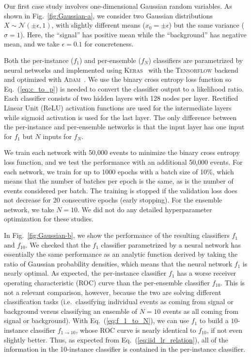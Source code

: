 \documentclass[aps,prx,reprint,preprintnumbers,superscriptaddress,nofootinbib,longbibliography,floatfix]{revtex4-2}
\DeclareRobustCommand{\Fig}[1]{Fig.~\ref{fig:#1}}
\DeclareRobustCommand{\Eq}[1]{Eq.~(\ref{eq:#1})}
\begin{document}
Our first case study involves one-dimensional Gaussian random variables.
%
As shown in \Fig{Gaussian-a}, we consider two Gaussian distributions $X\sim\mathcal{N}(\pm\epsilon,1)$, with slightly different means ($x_0 = \pm \epsilon$) but the same variance ($\sigma = 1$).
%
Here, the ``signal'' has positive mean while the ``background'' has negative mean, and we take $\epsilon=0.1$ for concreteness.


Both the per-instance ($f_1$) and per-ensemble ($f_N$) classifiers are parametrized by neural networks and implemented using \textsc{Keras}~\cite{keras} with the \textsc{Tensorflow} backend~\cite{tensorflow} and optimized with \textsc{Adam}~\cite{adam}.
%
We use the binary cross entropy loss function so \Eq{c_to_p} is needed to convert the classifier output to a likelihood ratio.
%
Each classifier consists of two hidden layers with 128 nodes per layer.
%
Rectified Linear Unit (ReLU) activation functions are used for the intermediate layers while sigmoid activation is used for the last layer.
%
The only difference between the per-instance and per-ensemble networks is that the input layer has one input for $f_1$ but $N$ inputs for $f_N$.


We train each network with 50,000 events to minimize the binary cross entropy loss function, and we test the performance with an additional 50,000 events.
%
For each network, we train for up to 1000 epochs with a batch size of 10\%, which means that the number of batches per epoch is the same, as is the number of events considered per batch.  
%
The training is stopped if the validation loss does not decrease for 20 consecutive epochs (early stopping).
%
For the ensemble network, we take $N = 10$.
%
We did not do any detailed hyperparameter optimization for these studies.


In \Fig{Gaussian-b}, we show the performance of the resulting classifiers $f_1$ and $f_{10}$.
%
We checked that the $f_1$ classifier parametrized by a neural network has essentially the same performance as an analytic function derived by taking the ratio of Gaussian probability densities, which means that the neural network $f_1$ is nearly optimal.
%
As expected, the per-instance classifier $f_1$ has a worse receiver operating characteristic (ROC) curve than the per-ensemble classifier $f_{10}$.
%
This is not a relevant comparison, however, because the two are solving different classification tasks (i.e.~classifying individual events as coming from signal or background versus classifying an ensemble of $N = 10$ events as all coming from signal or background).
%
With \Eq{f_1_to_N}, we can use $f_1$ to build a $10$-instance classifier $f_{1\rightarrow 10}$, whose ROC curve is nearly identical to $f_{10}$, if not even slightly better.
%
Thus, as expected from \Eq{iid_lr_relation}, all of the information in the 10-instance classifier is contained in the per-instance classifier.
\end{document}
